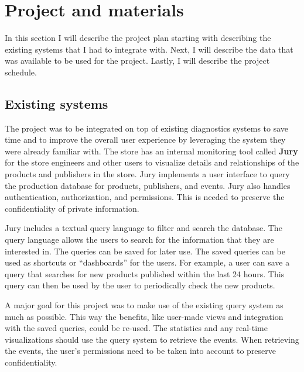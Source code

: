 
\clearpage
\section{Project and materials}
\label{sec:materials}

In this section I will describe the project plan starting with describing the existing systems that I had to integrate with.
Next, I will describe the data that was available to be used for the project. 
Lastly, I will describe the project schedule.

\subsection{Existing systems}

The project was to be integrated on top of existing diagnostics systems to save time and to improve the overall user experience by leveraging the system they were already familiar with.
The store has an internal monitoring tool called \textbf{Jury} for the store engineers and other users to visualize details and relationships of the products and publishers in the store.
Jury implements a user interface to query the production database for products, publishers, and events.
Jury also handles authentication, authorization, and permissions.
This is needed to preserve the confidentiality of private information.

Jury includes a textual query language to filter and search the database.
The query language allows the users to search for the information that they are interested in.
The queries can be saved for later use. 
The saved queries can be used as shortcuts or ``dashboards'' for the users.
For example, a user can save a query that searches for new products published within the last 24 hours.
This query can then be used by the user to periodically check the new products.

A major goal for this project was to make use of the existing query system as much as possible.
This way the benefits, like user-made views and integration with the saved queries, could be re-used.
The statistics and any real-time visualizations should use the query system to retrieve the events.
When retrieving the events, the user's permissions need to be taken into account to preserve confidentiality.

